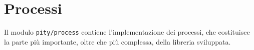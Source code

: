 \section{Processi}

Il modulo \lstinline{pity/process} contiene l'implementazione dei
processi, che costituisce la parte pi\`u importante, oltre che pi\`u
complessa, della libreria sviluppata.




